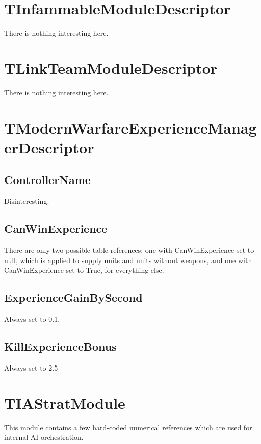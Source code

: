\documentclass{article}
\begin{document}
\section{TInfammableModuleDescriptor}

There is nothing interesting here.

\section{TLinkTeamModuleDescriptor}

There is nothing interesting here.

\section{TModernWarfareExperienceManagerDescriptor}

\subsection{ControllerName}

Disinteresting.

\subsection{CanWinExperience}

There are only two possible table references: one with CanWinExperience set to null, which is applied to supply units and units without weapons, and one with CanWinExperience set to True, for everything else.

\subsection{ExperienceGainBySecond}

Always set to 0.1.

\subsection{KillExperienceBonus}

Always set to 2.5

\section{TIAStratModule}

This module contains a few hard-coded numerical references which are used for internal AI orchestration.
\end{document}
